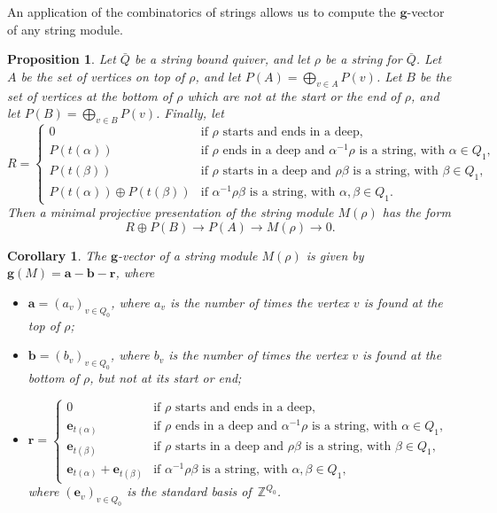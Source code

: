 \documentclass{amsart}
\newtheorem{corollary}[theorem]{Corollary}
\newtheorem{proposition}[theorem]{Proposition}
\theoremstyle{definition}
\newcommand{\Z}{\mathbb{Z}} %
\renewcommand{\b}[1]{\mathbf{#1}} %
\begin{document}
An application of the combinatorics of strings allows us to compute the $\b{g}$-vector of any string module.

\begin{proposition}
 Let $\bar Q$ be a string bound quiver, and let $\rho$ be a string for $\bar Q$.  
 Let $A$ be the set of vertices on top of $\rho$, and let $P(A) = \bigoplus_{v\in A} P(v)$.
 Let $B$ be the set of vertices at the bottom of $\rho$ which are not at the start or the end of $\rho$,
 and let $P(B) = \bigoplus_{v\in B} P(v)$.  Finally, let 
 \[
  R = \begin{cases}
          0 & \textrm{if $\rho$ starts and ends in a deep,} \\
          P({t(\alpha)})   & \textrm{if $\rho$ ends in a deep and $\alpha^{-1}\rho$ is a string, with $\alpha\in Q_1$,} \\
          P({t(\beta)})    & \textrm{if $\rho$ starts in a deep and $\rho\beta$ is a string, with $\beta\in Q_1$,} \\
          P({t(\alpha)}) \oplus P({t(\beta)})  & \textrm{if $\alpha^{-1}\rho\beta$ is a string, with $\alpha, \beta\in Q_1$.}
        \end{cases}
 \]
 Then a minimal projective presentation of the string module $M(\rho)$ has the form
 \[
  R\oplus P(B) \to P(A) \to M(\rho) \to 0.
 \]
\end{proposition}

\begin{corollary}
 The $\b{g}$-vector of a string module $M(\rho)$ is given by $\b{g}(M) = \b{a} - \b{b} - \b{r}$, where
 \begin{itemize}
  \item $\b{a} = (a_v)_{v\in Q_0}$, where $a_v$ is the number of times the vertex $v$ is found at the top of $\rho$;
  \item $\b{b} = (b_v)_{v\in Q_0}$, where $b_v$ is the number of times the vertex $v$ is found at the bottom of $\rho$,
        but not at its start or end;
        \medskip
  \item 
  		\(
         \b{r} = \begin{cases}
                   0 & \textrm{if $\rho$ starts and ends in a deep,} \\
                   \b{e}_{t(\alpha)}   & \textrm{if $\rho$ ends in a deep and $\alpha^{-1}\rho$ is a string, with $\alpha\in Q_1$,} \\
                   \b{e}_{t(\beta)}    & \textrm{if $\rho$ starts in a deep and $\rho\beta$ is a string, with $\beta\in Q_1$,} \\
                   \b{e}_{t(\alpha)} + \b{e}_{t(\beta)}  & \textrm{if $\alpha^{-1}\rho\beta$ is a string, with $\alpha, \beta\in Q_1$,}
                  \end{cases}
        \) \\
        \medskip
        where $(\b{e}_v)_{v \in Q_0}$ is the standard basis of~$\Z^{Q_0}$.
 \end{itemize}
\end{corollary}
\end{document}
